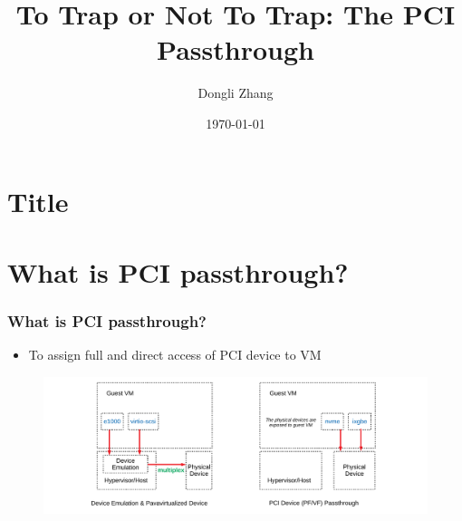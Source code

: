 \documentclass[aspectratio=169]{beamer}
\title[To Trap or Not To Trap: The PCI Passthrough]{To Trap or Not To Trap: The PCI Passthrough} %
\author{Dongli Zhang} %
\date{\today} %
\begin{document}

\section{Title}
\begin{frame}
\titlepage %
\end{frame}


\section{What is PCI passthrough?}
\begin{frame}
\frametitle{What is PCI passthrough?}
\begin{itemize}
\item To assign full and direct access of PCI device to VM
\begin{itemize}
\end{itemize}
\end{itemize}
\begin{figure}
\includegraphics[width=1.0\linewidth]{figures/passthrough.pdf}
\end{figure}
\end{frame}

\end{document}

